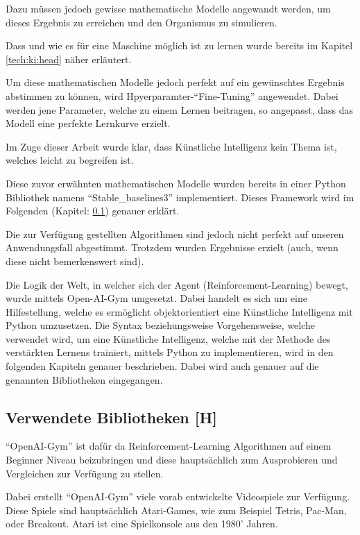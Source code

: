 Dazu müssen jedoch gewisse mathematische Modelle angewandt werden, um dieses Ergebnis zu erreichen und den Organismus zu simulieren.

Dass und wie es für eine Maschine möglich ist zu lernen wurde bereits im Kapitel \ref{tech:ki:head} näher erläutert.

Um diese mathematischen Modelle jedoch perfekt auf ein gewünschtes Ergebnis abstimmen zu können, wird Hpyerparamter-``Fine-Tuning'' angewendet. Dabei werden jene Parameter, welche zu einem Lernen beitragen, so angepasst, dass das Modell eine perfekte Lernkurve erzielt.

Im Zuge dieser Arbeit wurde klar, dass Künstliche Intelligenz kein Thema ist, welches leicht zu begreifen ist.

Diese zuvor erwähnten mathematischen Modelle wurden bereits in einer Python Bibliothek namens ``Stable\_baselines3'' implementiert. Dieses Framework wird im Folgenden (Kapitel: \ref{maai:usedLibraries}) genauer erklärt.

Die zur Verfügung gestellten Algorithmen sind jedoch nicht perfekt auf unseren Anwendungsfall abgestimmt. Trotzdem wurden Ergebnisse erzielt (auch, wenn diese nicht bemerkenswert sind).

Die Logik der Welt, in welcher sich der Agent (Reinforcement-Learning) bewegt, wurde mittels Open-AI-Gym umgesetzt. Dabei handelt es sich um eine Hilfestellung, welche es ermöglicht objektorientiert eine Künstliche Intelligenz mit Python umzusetzen. Die Syntax beziehungsweise Vorgehensweise, welche verwendet wird, um eine Künstliche Intelligenz, welche mit der Methode des verstärkten Lernens trainiert, mittels Python zu implementieren, wird in den folgenden Kapiteln genauer beschrieben. Dabei wird auch genauer auf die genannten Bibliotheken eingegangen.

\subsection{Verwendete Bibliotheken [H]}\label{maai:usedLibraries}


``OpenAI-Gym'' ist dafür da Reinforcement-Learning Algorithmen auf einem Beginner Niveau beizubringen und diese hauptsächlich zum Ausprobieren und Vergleichen zur Verfügung zu stellen.

Dabei erstellt ``OpenAI-Gym'' viele vorab entwickelte Videospiele zur Verfügung. Diese Spiele sind hauptsächlich Atari-Games, wie zum Beispiel Tetris, Pac-Man, oder Breakout. Atari ist eine Spielkonsole aus den 1980' Jahren.

